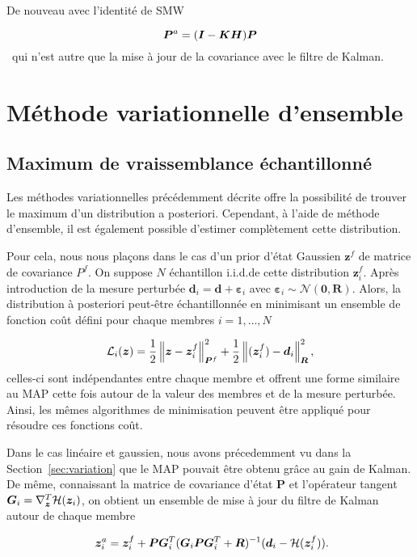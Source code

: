 De nouveau avec l'identité de SMW

\begin{equation*}
    \bm{P}^a = (\bm{I} - \bm{K} \bm{H}) \bm{P}
\end{equation*}~qui n'est autre que la mise à jour de la covariance avec le filtre de Kalman.

\section{Méthode variationnelle d'ensemble}

\subsection{Maximum de vraissemblance échantillonné}
Les méthodes variationnelles précédemment décrite offre la possibilité de trouver le maximum d'un distribution a posteriori. Cependant, à l'aide de méthode d'ensemble, il est également possible d'estimer complètement cette distribution.

Pour cela, nous nous plaçons dans le cas d'un prior d'état Gaussien $\bm z^f$ de matrice de covariance $P^f$. On suppose $N$ échantillon i.i.d.de cette distribution $\bm z^f_i$. Après introduction de la mesure perturbée $\bm d_i = \bm d + \bm \varepsilon_i$ avec $\bm \varepsilon_i \sim \mathcal{N}(\bm 0, \bm R)$. Alors, la distribution à posteriori peut-être échantillonnée en minimisant un ensemble de fonction coût défini pour chaque membres $i = 1, \dots, N$

\begin{equation*}
    \mathcal L_i(\bm z) = \frac12 \left\lVert \bm z -\bm z^f_i \right\rVert^2_{\bm P^f} + \frac12 \left\lVert \mathcal(\bm z^f_i) - \bm d_i \right\rVert_{\bm R}^2,
\end{equation*}celles-ci sont indépendantes entre chaque membre et offrent une forme similaire au MAP cette fois autour de la valeur des membres et de la mesure perturbée. Ainsi, les mêmes algorithmes de minimisation peuvent être appliqué pour résoudre ces fonctions coût.

Dans le cas linéaire et gaussien, nous avons précedemment vu dans la Section~\ref{sec:variation} que le MAP pouvait être obtenu grâce au gain de Kalman. De même, connaissant la matrice de covariance d'état $\bm P$ et l'opérateur tangent $\bm G_i = \nabla^T_{\bm z} \mathcal H (\bm z_i)$, on obtient un ensemble de mise à jour du filtre de Kalman autour de chaque membre

\begin{equation}~\label{eq:rml-kalman}
    \bm z ^a_i = \bm z^f_i + \bm P \bm G_i^T (\bm G_i \bm{P} \bm G_i^T + \bm{R})^{-1} (\bm{d}_i - \mathcal H(\bm z_i^f)).
\end{equation}

